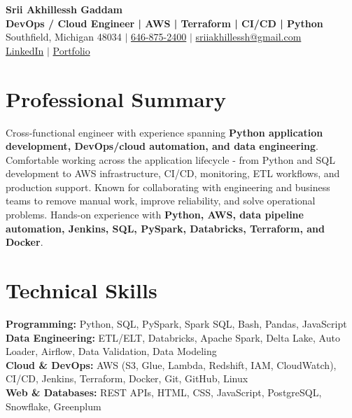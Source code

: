 \documentclass[letterpaper,10pt]{article}
\begin{document}
\fontsize{9.35pt}{10.45pt}\selectfont

\begin{center}
    {\LARGE \textbf{Srii Akhillessh Gaddam}} \\[-1pt]
    \textbf{DevOps / Cloud Engineer | AWS | Terraform | CI/CD | Python} \\[2pt]
    Southfield, Michigan 48034 $|$
    \href{tel:6468752400}{646-875-2400} $|$
    \href{mailto:sriiakhillessh@gmail.com}{sriiakhillessh@gmail.com} \\[1pt]
    \href{https://www.linkedin.com/in/srii-akhiilessh-gaddam-b48668191/}{LinkedIn} $|$
    \href{https://sriiakhillesshg.github.io/portfolio/}{Portfolio}
\end{center}
\vspace{-8pt}

\section{Professional Summary}
\small{Cross-functional engineer with experience spanning \textbf{Python application development, DevOps/cloud automation, and data engineering}. Comfortable working across the application lifecycle - from Python and SQL development to AWS infrastructure, CI/CD, monitoring, ETL workflows, and production support. Known for collaborating with engineering and business teams to remove manual work, improve reliability, and solve operational problems. Hands-on experience with \textbf{Python, AWS, data pipeline automation, Jenkins, SQL, PySpark, Databricks, Terraform, and Docker}.}

\section{Technical Skills}
\small{
\textbf{Programming:} Python, SQL, PySpark, Spark SQL, Bash, Pandas, JavaScript \\
\textbf{Data Engineering:} ETL/ELT, Databricks, Apache Spark, Delta Lake, Auto Loader, Airflow, Data Validation, Data Modeling \\
\textbf{Cloud \& DevOps:} AWS (S3, Glue, Lambda, Redshift, IAM, CloudWatch), CI/CD, Jenkins, Terraform, Docker, Git, GitHub, Linux \\
\textbf{Web \& Databases:} REST APIs, HTML, CSS, JavaScript, PostgreSQL, Snowflake, Greenplum
}
\end{document}
